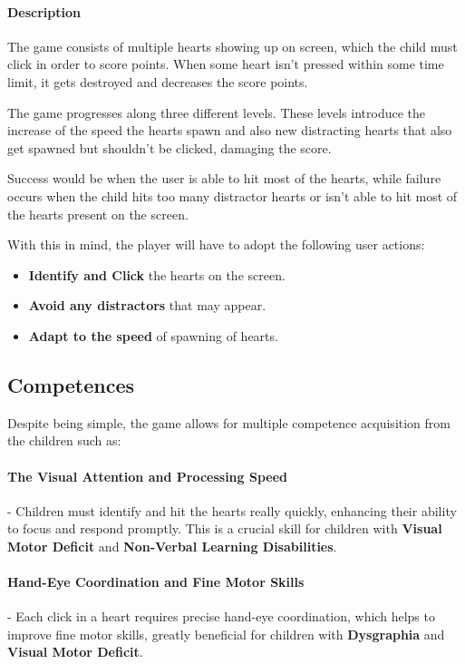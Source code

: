 \paragraph{Description}
The game consists of multiple hearts showing up on screen, which the child must click in order to score points. When some heart isn't pressed within some time limit, it gets destroyed and decreases the score points.

The game progresses along three different levels. These levels introduce the increase of the speed the hearts spawn and also new distracting hearts that also get spawned but shouldn't be clicked, damaging the score.

Success would be when the user is able to hit most of the hearts, while failure occurs when the child hits too many distractor hearts or isn't able to hit most of the hearts present on the screen.

With this in mind, the player will have to adopt the following user actions:

\begin{itemize}
    \item \textbf{Identify and Click} the hearts on the screen.
    \item \textbf{Avoid any distractors} that may appear.
    \item \textbf{Adapt to the speed} of spawning of hearts.
\end{itemize}

\subsection*{Competences}
Despite being simple, the game allows for multiple competence acquisition from the children such as:

\paragraph{The Visual Attention and Processing Speed}- Children must identify and hit the hearts really quickly, enhancing their ability to focus and respond promptly. This is a crucial skill for children with \textbf{Visual Motor Deficit} and \textbf{Non-Verbal Learning Disabilities}.

\paragraph{Hand-Eye Coordination and Fine Motor Skills}- Each click in a heart requires precise hand-eye coordination, which helps to improve fine motor skills, greatly beneficial for children with \textbf{Dysgraphia} and \textbf{Visual Motor Deficit}.


